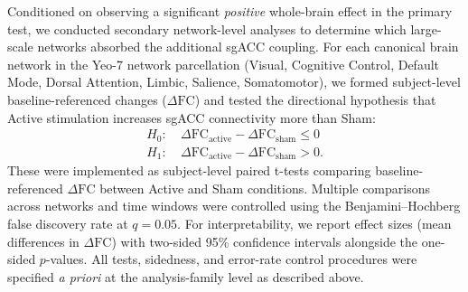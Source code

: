 Conditioned on observing a significant \emph{positive} whole-brain effect in the primary test, we conducted secondary network-level analyses to determine which large-scale networks absorbed the additional sgACC coupling. For each canonical brain network in the Yeo-7 network parcellation \cite{yeo2011organization} (Visual, Cognitive Control, Default Mode, Dorsal Attention, Limbic, Salience, Somatomotor), we formed subject-level baseline-referenced changes ($\Delta\mathrm{FC}$) and tested the directional hypothesis that Active stimulation increases sgACC connectivity more than Sham:
\begin{equation}
\label{eq:network_hypothesis}
\begin{aligned}
H_0:&\ \Delta\mathrm{FC}_{\text{active}} - \Delta\mathrm{FC}_{\text{sham}} \le 0\\
H_1:&\ \Delta\mathrm{FC}_{\text{active}} - \Delta\mathrm{FC}_{\text{sham}} > 0.
\end{aligned}
\end{equation}
These were implemented as subject-level paired t-tests comparing baseline-referenced $\Delta\mathrm{FC}$ between Active and Sham conditions. Multiple comparisons across networks and time windows were controlled using the Benjamini–Hochberg false discovery rate at $q=0.05$. For interpretability, we report effect sizes (mean differences in $\Delta\mathrm{FC}$) with two-sided 95\% confidence intervals alongside the one-sided $p$-values. All tests, sidedness, and error-rate control procedures were specified \emph{a priori} at the analysis-family level as described above.

